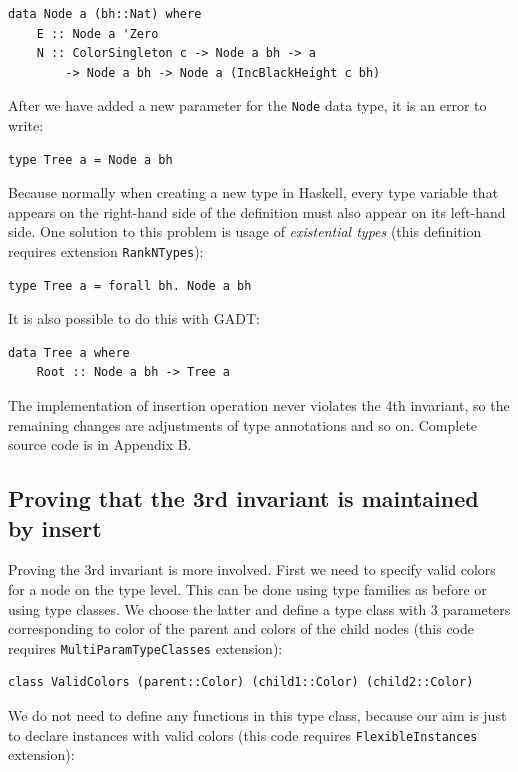 \documentclass{tmr}
\newcommand{\italic}[1]{\textit{#1}}
\begin{document}
\begin{Verbatim}
data Node a (bh::Nat) where
    E :: Node a 'Zero
    N :: ColorSingleton c -> Node a bh -> a
        -> Node a bh -> Node a (IncBlackHeight c bh)
\end{Verbatim}

After we have added a new parameter for the \verb|Node| data type, it is an error to write:

\begin{Verbatim}
type Tree a = Node a bh
\end{Verbatim}

Because normally when creating a new type in Haskell, every type variable that appears on the right-hand side of the definition must also appear on its left-hand side. One solution to this problem is usage of \italic{existential types} (this definition requires extension \verb|RankNTypes|):

\begin{Verbatim}
type Tree a = forall bh. Node a bh
\end{Verbatim}

It is also possible to do this with GADT:

\begin{Verbatim}
data Tree a where
    Root :: Node a bh -> Tree a
\end{Verbatim}

The implementation of insertion operation never violates the 4th invariant, so the remaining changes are adjustments of type annotations and so on. Complete source code is in Appendix B.

\subsection{Proving that the 3rd invariant is maintained by insert}

Proving the 3rd invariant is more involved. First we need to specify valid colors for a node on the type level. This can be done using type families as before or using type classes. We choose the latter and define a type class with 3 parameters corresponding to color of the parent and colors of the child nodes (this code requires \verb|MultiParamTypeClasses| extension):

\begin{Verbatim}
class ValidColors (parent::Color) (child1::Color) (child2::Color)
\end{Verbatim}

We do not need to define any functions in this type class, because our aim is just to declare instances with valid colors (this code requires \verb|FlexibleInstances| extension):
\end{document}

